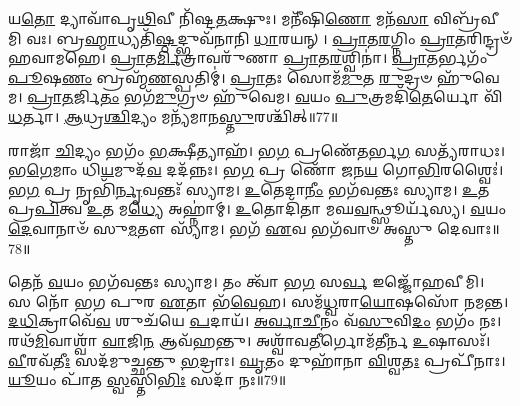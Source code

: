 𑌯\-\ul{𑌤𑍋} 𑌦𑍍𑌯𑌾𑌵𑌾᳴𑌪𑍃\-\ul{𑌥𑌿}\-𑌵𑍀 𑌨𑌿᳴𑌷𑍍𑌟\-\ul{𑌤}\-𑌕𑍍𑌷𑍁𑌃।
𑌮𑌨𑍀᳴𑌷𑌿\-\ul{𑌣𑍋} 𑌮𑌨᳴\-\ul{𑌸𑌾} 𑌵𑌿𑌬𑍍𑌰᳴𑌵𑍀𑌮𑌿 𑌵𑌃।
𑌬𑍍𑌰\-\ul{𑌹𑍍𑌮𑌾}\-𑌧𑍍𑌯𑌤𑌿᳴\-\ul{𑌷𑍍𑌠}\-𑌦𑍍𑌭𑍁𑌵᳴𑌨𑌾𑌨𑌿 \ul{𑌧𑌾}\-𑌰𑌯𑌨𑍍।
\-\ul{𑌪𑍍𑌰𑌾}\-𑌤\-\ul{𑌰}\-𑌗𑍍𑌨𑌿𑌂 \ul{𑌪𑍍𑌰𑌾}\-𑌤𑌰𑌿𑌨𑍍𑌦𑍍𑌰𑍞᳴ 𑌹𑌵𑌾𑌮𑌹𑍇।
\-\ul{𑌪𑍍𑌰𑌾}\-𑌤\-\ul{𑌰𑍍𑌮𑌿}\-𑌤𑍍𑌰𑌾𑌵𑌰𑍁᳴𑌣𑌾 \ul{𑌪𑍍𑌰𑌾}\-𑌤\-\ul{𑌰}\-𑌶𑍍𑌵𑌿𑌨𑌾॑।
\-\ul{𑌪𑍍𑌰𑌾}\-𑌤𑌰𑍍𑌭𑌗𑌂᳴ \ul{𑌪𑍂}\-𑌷\-\ul{𑌣𑌂} 𑌬𑍍𑌰𑌹𑍍𑌮᳴\-\ul{𑌣}\-𑌸𑍍𑌪𑌤𑌿𑌮𑍍॑।
\-\ul{𑌪𑍍𑌰𑌾}\-𑌤𑌃 𑌸𑍋𑌮᳴\-\ul{𑌮𑍁}\-𑌤 \ul{𑌰𑍁}\-𑌦𑍍𑌰𑍞 𑌹𑍁᳴𑌵𑍇𑌮।
\-\ul{𑌪𑍍𑌰𑌾}\-\-\ul{𑌤}\-𑌰𑍍𑌜𑌿\-\ul{𑌤𑌂} 𑌭𑌗᳴\-\ul{𑌮𑍁}\-𑌗𑍍𑌰𑍞 𑌹𑍁᳴𑌵𑍇𑌮।
\-\ul{𑌵}\-𑌯𑌂 \ul{𑌪𑍁}\-𑌤𑍍𑌰𑌮𑌦𑌿᳴\-\ul{𑌤𑍇}\-𑌰𑍍𑌯𑍋 𑌵𑌿᳴\-\ul{𑌧}\-𑌰𑍍𑌤𑌾।
\-\ul{𑌆}\-𑌧𑍍𑌰\-\ul{𑌶𑍍𑌚𑌿}\-𑌦𑍍𑌯𑌂 𑌮𑌨𑍍𑌯᳴𑌮𑌾𑌨\-\ul{𑌸𑍍𑌤𑍁}\-𑌰𑌶𑍍𑌚𑌿᳴𑌤𑍍॥77॥

𑌰𑌾𑌜𑌾᳴ \ul{𑌚𑌿}\-𑌦𑍍𑌯𑌂 𑌭𑌗𑌂᳴ \ul{𑌭}\-𑌕𑍍𑌷𑍀𑌤𑍍𑌯𑌾𑌹᳴।
𑌭\-\ul{𑌗} 𑌪𑍍𑌰𑌣𑍇᳴\-\ul{𑌤}\-𑌰𑍍𑌭\-\ul{𑌗} 𑌸𑌤𑍍𑌯᳴𑌰𑌾𑌧𑌃।
𑌭\-\ul{𑌗𑍇}\-𑌮𑌾𑌂 𑌧𑌿\-\ul{𑌯}\-𑌮𑍁𑌦᳴\-\ul{𑌵} 𑌦𑌦᳴𑌨𑍍𑌨𑌃।
𑌭\-\ul{𑌗} 𑌪𑍍𑌰 𑌣𑍋᳴ 𑌜𑌨\-\ul{𑌯} 𑌗𑍋\-\ul{𑌭𑌿}\-𑌰𑌶𑍍𑌵𑍈𑌃॑।
𑌭\-\ul{𑌗} 𑌪𑍍𑌰 𑌨𑍃𑌭𑌿᳴\-\ul{𑌰𑍍𑌨𑍃}\-𑌵𑌨𑍍𑌤𑌃᳴ 𑌸𑍍𑌯𑌾𑌮।
\-\ul{𑌉}\-𑌤𑍇𑌦𑌾\-\ul{𑌨𑍀𑌂} 𑌭𑌗᳴𑌵𑌨𑍍𑌤𑌃 𑌸𑍍𑌯𑌾𑌮।
\-\ul{𑌉}\-𑌤 𑌪𑍍𑌰\-\ul{𑌪𑌿}\-𑌤𑍍𑌵 \ul{𑌉}\-𑌤 𑌮\-\ul{𑌧𑍍𑌯𑍇} 𑌅𑌹𑍍𑌨𑌾॑𑌮𑍍।
\-\ul{𑌉}\-𑌤𑍋𑌦𑌿᳴𑌤𑌾 𑌮𑌘\-\ul{𑌵}\-𑌨𑍍𑌥𑍍𑌸𑍂𑌰𑍍𑌯᳴𑌸𑍍𑌯।
\-\ul{𑌵}\-𑌯𑌂 \ul{𑌦𑍇}\-𑌵𑌾𑌨𑌾𑍞᳴ 𑌸𑍁\-\ul{𑌮}\-𑌤𑍗 𑌸𑍍𑌯𑌾᳴𑌮।
𑌭𑌗᳴ \ul{𑌏}\-𑌵 𑌭𑌗᳴𑌵𑌾𑍞 𑌅𑌸𑍍𑌤𑍁 𑌦𑍇𑌵𑌾𑌃॥78॥

𑌤𑍇𑌨᳴ \ul{𑌵}\-𑌯𑌂 𑌭𑌗᳴𑌵𑌨𑍍𑌤𑌃 𑌸𑍍𑌯𑌾𑌮।
𑌤𑌂 𑌤𑍍𑌵𑌾᳴ 𑌭\-\ul{𑌗} 𑌸\-\ul{𑌰𑍍𑌵} 𑌇𑌜𑍍𑌜𑍋᳴𑌹𑌵𑍀𑌮𑌿।
𑌸 𑌨𑍋᳴ 𑌭𑌗 𑌪𑍁𑌰 \ul{𑌏}\-𑌤𑌾 𑌭᳴\-\ul{𑌵𑍇}\-𑌹।
𑌸𑌮᳴\-\ul{𑌧𑍍𑌵}\-𑌰𑌾\-\ul{𑌯𑍋}\-𑌷𑌸𑍋᳴ 𑌨𑌮𑌨𑍍𑌤।
\-\ul{𑌦}\-\-\ul{𑌧𑌿}\-𑌕𑍍𑌰𑌾𑌵𑍇᳴\-\ul{𑌵} 𑌶𑍁𑌚᳴𑌯𑍇 \ul{𑌪}\-𑌦𑌾𑌯᳴।
\-\ul{𑌅}\-\-\ul{𑌰𑍍𑌵𑌾}\-\-\ul{𑌚𑍀}\-𑌨𑌂 𑌵᳴\-\ul{𑌸𑍁}\-𑌵𑌿\-\ul{𑌦𑌂} 𑌭𑌗𑌂᳴ 𑌨𑌃।
𑌰𑌥᳴\-\ul{𑌮𑌿}\-𑌵𑌾𑌶𑍍𑌵𑌾᳴ \ul{𑌵𑌾}\-𑌜𑌿\-\ul{𑌨} 𑌆𑌵᳴𑌹𑌨𑍍𑌤𑍁।
𑌅𑌶𑍍𑌵𑌾᳴𑌵\-\ul{𑌤𑍀}\-𑌰𑍍𑌗𑍋𑌮᳴𑌤𑍀𑌰𑍍𑌨 \ul{𑌉}\-𑌷𑌾𑌸𑌃᳴।
\-\ul{𑌵𑍀}\-𑌰𑌵᳴\-\ul{𑌤𑍀𑌃} 𑌸𑌦᳴𑌮𑍁𑌚𑍍𑌛𑌨𑍍𑌤𑍁 \ul{𑌭}\-𑌦𑍍𑌰𑌾𑌃।
\-\ul{𑌘𑍃}\-𑌤𑌂 𑌦𑍁𑌹𑌾᳴𑌨𑌾 \ul{𑌵𑌿}\-𑌶𑍍𑌵\-\ul{𑌤𑌃} 𑌪𑍍𑌰𑌪𑍀᳴𑌨𑌾𑌃।
\-\ul{𑌯𑍂}\-𑌯𑌂 𑌪𑌾᳴𑌤 \ul{𑌸𑍍𑌵}\-𑌸𑍍𑌤𑌿\-\ul{𑌭𑌿𑌃} 𑌸𑌦𑌾᳴ 𑌨𑌃॥79॥\anuvakamend[\-\ul{𑌵𑌿}\-\-\ul{𑌚}\-\-\ul{𑌕𑍍𑌷}\-𑌣𑌾 𑌵𑌿᳴𑌚\-\ul{𑌰𑍍𑌤𑍁}\-𑌰𑍞 𑌶\-\ul{𑌰𑍍𑌮}\-𑌨𑍍𑌨𑌧𑌿᳴ \ul{𑌵𑌿}\-𑌸𑌰𑍍𑌜᳴𑌨𑌾\-\ul{𑌯} 𑌬𑍍𑌰\-\ul{𑌹𑍍𑌮} 𑌵\-\ul{𑌨𑌂} 𑌬𑍍𑌰\-\ul{𑌹𑍍𑌮} 𑌸 \ul{𑌵𑍃}\-𑌕𑍍𑌷 𑌆᳴𑌸𑍀\-\ul{𑌤𑍍𑌤𑍁}\-𑌰𑌶𑍍𑌚𑌿᳴𑌦𑍍𑌦𑍇\-\ul{𑌵𑌾𑌃} 𑌪𑍍𑌰𑌪𑍀᳴\-\ul{𑌨𑌾} 𑌏𑌕𑌂᳴ 𑌚]
\clearpage
